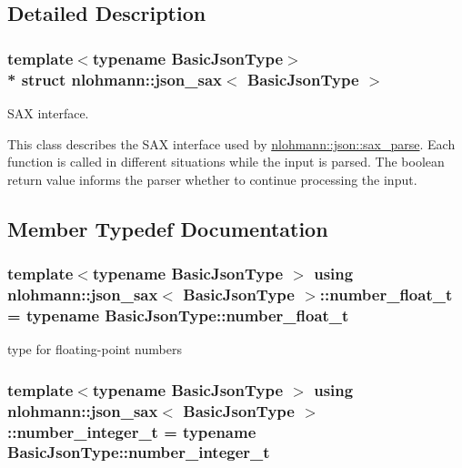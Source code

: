 \subsection{Detailed Description}
\subsubsection*{template$<$typename Basic\+Json\+Type$>$\\*
struct nlohmann\+::json\+\_\+sax$<$ Basic\+Json\+Type $>$}

S\+AX interface. 

This class describes the S\+AX interface used by \hyperlink{classnlohmann_1_1basic__json_a8a3dd150c2d1f0df3502d937de0871db}{nlohmann\+::json\+::sax\+\_\+parse}. Each function is called in different situations while the input is parsed. The boolean return value informs the parser whether to continue processing the input. 

\subsection{Member Typedef Documentation}
\subsubsection[{\texorpdfstring{number\+\_\+float\+\_\+t}{number_float_t}}]{\setlength{\rightskip}{0pt plus 5cm}template$<$typename Basic\+Json\+Type $>$ using {\bf nlohmann\+::json\+\_\+sax}$<$ Basic\+Json\+Type $>$\+::{\bf number\+\_\+float\+\_\+t} =  typename Basic\+Json\+Type\+::number\+\_\+float\+\_\+t}\hypertarget{structnlohmann_1_1json__sax_a390c209bffd8c4800c8f3076dc465a20}{}\label{structnlohmann_1_1json__sax_a390c209bffd8c4800c8f3076dc465a20}


type for floating-\/point numbers 

\subsubsection[{\texorpdfstring{number\+\_\+integer\+\_\+t}{number_integer_t}}]{\setlength{\rightskip}{0pt plus 5cm}template$<$typename Basic\+Json\+Type $>$ using {\bf nlohmann\+::json\+\_\+sax}$<$ Basic\+Json\+Type $>$\+::{\bf number\+\_\+integer\+\_\+t} =  typename Basic\+Json\+Type\+::number\+\_\+integer\+\_\+t}\hypertarget{structnlohmann_1_1json__sax_a0cef30121f02b7fee85e9708148ea0aa}{}\label{structnlohmann_1_1json__sax_a0cef30121f02b7fee85e9708148ea0aa}


